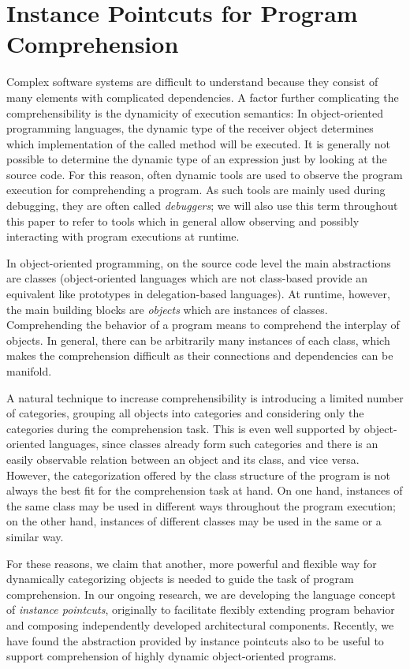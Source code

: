 \section{Instance Pointcuts for Program Comprehension} 
\label{sec:ipc:cocos}
Complex software systems are difficult to understand because they consist of many elements with complicated dependencies.
A factor further complicating the comprehensibility is the dynamicity of execution semantics:
In object-oriented programming languages, the dynamic type of the receiver object determines which implementation of the called method will be executed.
It is generally not possible to determine the dynamic type of an expression just by looking at the source code.
For this reason, often dynamic tools are used to observe the program execution for comprehending a program.
As such tools are mainly used during debugging, they are often called \emph{debuggers};
we will also use this term throughout this paper to refer to tools which in general allow observing and possibly interacting with program executions at runtime.

In object-oriented programming, on the source code level the main abstractions are classes (object-oriented languages which are not class-based provide an equivalent like prototypes in delegation-based languages).
At runtime, however, the main building blocks are \emph{objects} which are instances of classes.
Comprehending the behavior of a program means to comprehend the interplay of objects.
In general, there can be arbitrarily many instances of each class, which makes the comprehension difficult as their connections and dependencies can be manifold.

A natural technique to increase comprehensibility is introducing a limited number of categories, grouping all objects into categories and considering only the categories during the comprehension task.
This is even well supported by object-oriented languages, since classes already form such categories and there is an easily observable relation between an object and its class, and vice versa.
However, the categorization offered by the class structure of the program is not always the best fit for the comprehension task at hand.
On one hand, instances of the same class may be used in different ways throughout the program execution; on the other hand, instances of different classes may be used in the same or a similar way.

For these reasons, we claim that another, more powerful and flexible way for dynamically categorizing objects is needed to guide the task of program comprehension.
In our ongoing research, we are developing the language concept of \emph{instance pointcuts}, originally to facilitate flexibly extending program behavior and composing independently developed architectural components.
Recently, we have found the abstraction provided by instance pointcuts also to be useful to support comprehension of highly dynamic object-oriented programs.


